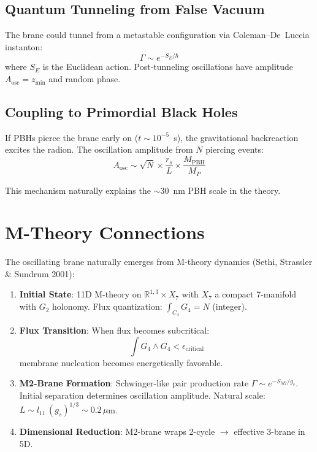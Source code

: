 \subsection{Quantum Tunneling from False Vacuum}

The brane could tunnel from a metastable configuration via Coleman--De~Luccia instanton:
\begin{equation}
\Gamma \sim e^{-S_E/\hbar}
\end{equation}
where $S_E$ is the Euclidean action. Post-tunneling oscillations have amplitude $A_\text{osc} = z_\text{min}$ and random phase.

\subsection{Coupling to Primordial Black Holes}

If PBHs pierce the brane early on ($t \sim 10^{-5}$~s), the gravitational backreaction excites the radion. The oscillation amplitude from $N$ piercing events:
\begin{equation}
A_\text{osc} \sim \sqrt{N} \times \frac{r_s}{L} \times \frac{M_\text{PBH}}{M_P}
\end{equation}

This mechanism naturally explains the $\sim 30$~nm PBH scale in the theory.

\section{M-Theory Connections}
\label{sec:mtheory}

The oscillating brane naturally emerges from M-theory dynamics (Sethi, Strassler \& Sundrum 2001):

\begin{enumerate}
  \item \textbf{Initial State}: 11D M-theory on $\mathbb{R}^{1,3} \times X_7$ with $X_7$ a compact 7-manifold with $G_2$ holonomy. Flux quantization: $\int_{C_4} G_4 = N$ (integer).

  \item \textbf{Flux Transition}: When flux becomes subcritical:
  \begin{equation}
  \int G_4 \wedge G_4 < \epsilon_\text{critical}
  \end{equation}
  membrane nucleation becomes energetically favorable.

  \item \textbf{M2-Brane Formation}: Schwinger-like pair production rate $\Gamma \sim e^{-S_{M2}/g_s}$. Initial separation determines oscillation amplitude. Natural scale: $L \sim l_{11}\,(g_s)^{1/3} \sim 0.2\,\mu$m.

  \item \textbf{Dimensional Reduction}: M2-brane wraps 2-cycle $\to$ effective 3-brane in 5D.
\end{enumerate}

